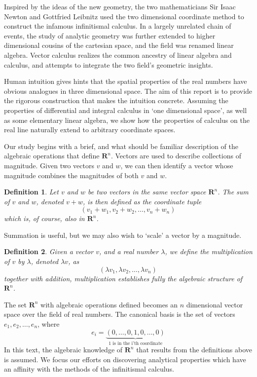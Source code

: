 \documentclass[12pt]{amsbook}
\theoremstyle{plain}
\newtheorem{definition}{Definition}
\theoremstyle{definition}
\begin{document}
Inspired by the ideas of the new geometry, the two mathematicians Sir Isaac Newton and Gottfried Leibnitz used the two dimensional coordinate method to construct the infamous infinitismal calculus. In a largely unrelated chain of events, the study of analytic geometry was further extended to higher dimensional cousins of the cartesian space, and the field was renamed linear algebra. Vector calculus realizes the common ancestry of linear algebra and calculus, and attempts to integrate the two field's geometric insights.

Human intuition gives hints that the spatial properties of the real numbers have obvious analogues in three dimensional space. The aim of this report is to provide the rigorous construction that makes the intuition concrete. Assuming the properties of differential and integral calculus in `one dimensional space', as well as some elementary linear algebra, we show how the properties of calculus on the real line naturally extend to arbitrary coordinate spaces.

Our study begins with a brief, and what should be familiar description of the algebraic operations that define $\mathbf{R}^n$. Vectors are used to describe collections of magnitude. Given two vectors $v$ and $w$, we can then identify a vector whose magnitude combines the magnitudes of both $v$ and $w$.

\begin{definition}
  Let $v$ and $w$ be two vectors in the same vector space $\mathbf{R}^n$. The sum of $v$ and $w$, denoted $v + w$, is then defined as the coordinate tuple
  \[ (v_1 + w_1, v_2 + w_2, \dots, v_n + w_n) \]
  which is, of course, also in $\mathbf{R}^n$.
\end{definition}

Summation is useful, but we may also wish to `scale' a vector by a magnitude.

\begin{definition}
  Given a vector $v$, and a real number $\lambda$, we define the multiplication of $v$ by $\lambda$, denoted $\lambda v$, as
  \[ (\lambda v_1, \lambda v_2, \dots, \lambda v_n) \]
  together with addition, multiplication establishes fully the algebraic structure of $\mathbf{R}^n$.
\end{definition}

The set $\mathbf{R}^n$ with algebraic operations defined becomes an $n$ dimensional vector space over the field of real numbers. The canonical basis is the set of vectors $e_1, e_2, \dots, e_n$, where
%
\[ e_i = \underbrace{(0, \dots, 0, 1, 0, \dots, 0)}_\text{1 is in the i'th coordinate} \]
%
In this text, the algebraic knowledge of $\mathbf{R}^n$ that results from the definitions above is assumed. We focus our efforts on discovering analytical properties which have an affinity with the methods of the infinitismal calculus.
\end{document}
